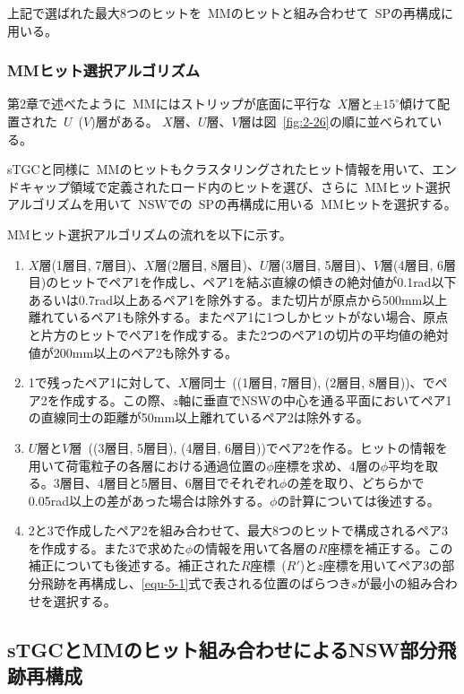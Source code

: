 上記で選ばれた最大8つのヒットを~MMのヒットと組み合わせて~SPの再構成に用いる。

\subsubsection{MMヒット選択アルゴリズム}
第2章で述べたように~MMにはストリップが底面に平行な~$X$層と$\pm15^\circ$傾けて配置された~$U$~($V$)層がある。
$X$層、$U$層、$V$層は図~\ref{fig:2-26}の順に並べられている。

sTGCと同様に~MMのヒットもクラスタリングされたヒット情報を用いて、エンドキャップ領域で定義されたロード内のヒットを選び、さらに~MMヒット選択アルゴリズムを用いて~NSWでの~SPの再構成に用いる~MMヒットを選択する。

MMヒット選択アルゴリズムの流れを以下に示す。
\begin{enumerate}
    \item $X$層(1層目, 7層目)、$X$層(2層目, 8層目)、$U$層(3層目, 5層目)、$V$層(4層目, 6層目)のヒットでペア1を作成し、ペア1を結ぶ直線の傾きの絶対値が0.1rad以下あるいは0.7rad以上あるペア1を除外する。また切片が原点から500mm以上離れているペア1も除外する。またペア1に1つしかヒットがない場合、原点と片方のヒットでペア1を作成する。また2つのペア1の切片の平均値の絶対値が200mm以上のペア2も除外する。
    \item 1で残ったペア1に対して、$X$層同士~((1層目, 7層目), (2層目, 8層目))、でペア2を作成する。この際、$z$軸に垂直でNSWの中心を通る平面においてペア1の直線同士の距離が50mm以上離れているペア2は除外する。
    \item $U$層と$V$層~((3層目, 5層目), (4層目, 6層目))でペア2を作る。ヒットの情報を用いて荷電粒子の各層における通過位置の$\phi$座標を求め、4層の$\phi$平均を取る。3層目、4層目と5層目、6層目でそれぞれ$\phi$の差を取り、どちらかで0.05rad以上の差があった場合は除外する。$\phi$の計算については後述する。
    \item 2と3で作成したペア2を組み合わせて、最大8つのヒットで構成されるペア3を作成する。また3で求めた$\phi$の情報を用いて各層の$R$座標を補正する。この補正についても後述する。補正された$R$座標~($R'$)と$z$座標を用いてペア3の部分飛跡を再構成し、\eqref{equ-5-1}式で表される位置のばらつき$s$が最小の組み合わせを選択する。
\end{enumerate}


\subsection{sTGCとMMのヒット組み合わせによるNSW部分飛跡再構成}\label{5-1-2}

